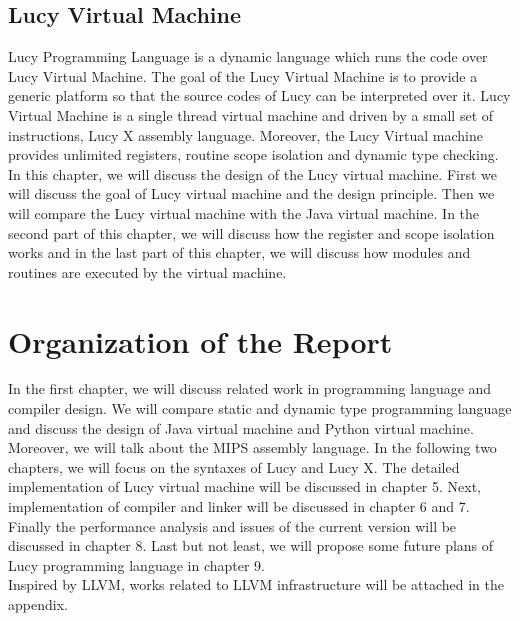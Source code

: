 \subsection{Lucy Virtual Machine}
Lucy Programming Language is a dynamic language which runs the code over Lucy Virtual Machine. The goal of the Lucy Virtual Machine is to provide a generic platform so that the source codes of Lucy can be interpreted over it. Lucy Virtual Machine is a single thread virtual machine and driven by a small set of instructions, Lucy X assembly language. Moreover, the Lucy Virtual machine provides unlimited registers, routine scope isolation and dynamic type checking. In this chapter, we will discuss the design of the Lucy virtual machine. First we will discuss the goal of Lucy virtual machine and the design principle. Then we will compare the Lucy virtual machine with the Java virtual machine. In the second part of this chapter, we will discuss how the register and scope isolation works and in the last part of this chapter, we will discuss how modules and routines are executed by the virtual machine.

\section{Organization of the Report}
In the first chapter, we will discuss related work in programming language and compiler design. We will compare static and dynamic type programming language and discuss the design of Java virtual machine and Python virtual machine. Moreover, we will talk about the MIPS assembly language. In the following two chapters, we will focus on the syntaxes of Lucy and Lucy X. The detailed implementation of Lucy virtual machine will be discussed in chapter 5. Next, implementation of compiler and linker will be discussed in chapter 6 and 7. Finally the performance analysis and issues of the current version will be discussed in chapter 8. Last but not least, we will propose some future plans of Lucy programming language in chapter 9. \\
Inspired by LLVM, works related to LLVM infrastructure will be attached in the appendix.

